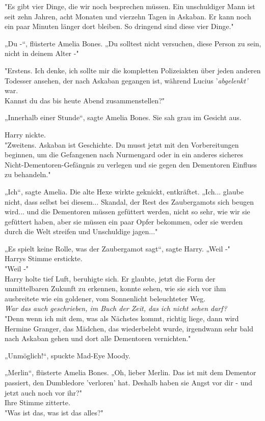 {"Es gibt vier Dinge, die wir noch besprechen müssen. Ein unschuldiger Mann ist seit zehn Jahren, acht Monaten und vierzehn Tagen in Askaban. Er kann noch ein paar Minuten länger dort bleiben. So dringend sind diese vier Dinge."

„Du -“, flüsterte Amelia Bones. „Du solltest nicht versuchen, diese Person zu sein, nicht in deinem Alter -"

"Erstens. Ich denke, ich sollte mir die kompletten Polizeiakten über jeden anderen Todesser ansehen, der nach Askaban gegangen ist, während Lucius '\emph{abgelenkt'} war.\\ Kannst du das bis heute Abend zusammenstellen?"

„Innerhalb einer Stunde“, sagte Amelia Bones. Sie sah grau im Gesicht aus.

Harry nickte.\\ "Zweitens. Askaban ist Geschichte. Du musst jetzt mit den Vorbereitungen beginnen, um die Gefangenen nach Nurmengard oder in ein anderes sicheres Nicht-Dementoren-Gefängnis zu verlegen und sie gegen den Dementoren Einfluss zu behandeln."

„Ich“, sagte Amelia. Die alte Hexe wirkte geknickt, entkräftet. „Ich... glaube nicht, dass selbst bei diesem... Skandal, der Rest des Zaubergamots sich beugen wird... und die Dementoren müssen gefüttert werden, nicht so sehr, wie wir sie gefüttert haben, aber sie müssen ein paar Opfer bekommen, oder sie werden durch die Welt streifen und Unschuldige jagen..."

„Es spielt keine Rolle, was der Zaubergamot sagt“, sagte Harry. „Weil -"\\ Harrys Stimme erstickte.\\ "Weil -"\\ Harry holte tief Luft, beruhigte sich. Er glaubte, jetzt die Form der unmittelbaren Zukunft zu erkennen, konnte sehen, wie sie sich vor ihm ausbreitete wie ein goldener, vom Sonnenlicht beleuchteter Weg.\\ \emph{War das auch geschrieben, im Buch der Zeit, das ich nicht sehen darf?}\\ "Denn wenn ich mit dem, was als Nächstes kommt, richtig liege, dann wird Hermine Granger, das Mädchen, das wiederbelebt wurde, irgendwann sehr bald nach Askaban gehen und dort alle Dementoren vernichten."

„Unmöglich!“, spuckte Mad-Eye Moody.

„Merlin“, flüsterte Amelia Bones. „Oh, lieber Merlin. Das ist mit dem Dementor passiert, den Dumbledore 'verloren' hat. Deshalb haben sie Angst vor dir - und jetzt auch noch vor ihr?"\\ Ihre Stimme zitterte.\\ "Was ist das, was ist das alles?"

}
